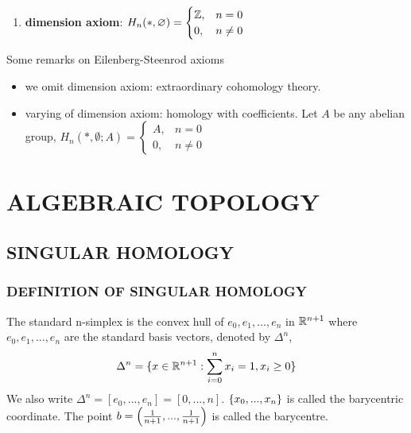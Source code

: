 \documentclass{report}
\begin{document}
\begin{axiom}
\begin{enumerate}
        \item \textbf{dimension axiom}: $H_n(*, \emptyset) = \begin{cases}
            \Z, &n = 0 \\
            0, &n \neq 0
        \end{cases}$
    \end{enumerate}
\end{axiom}

\begin{remark}
    Some remarks on Eilenberg-Steenrod axioms
    \begin{itemize}
        \item we omit dimension axiom: extraordinary cohomology theory.
        \item varying of dimension axiom: homology with coefficients. Let $A$ be any abelian group, $H_n(*, \emptyset; A) = \begin{cases}
            A, &n = 0 \\
            0, &n \neq 0
        \end{cases}$
    \end{itemize}
    
\end{remark}







\chapter{ALGEBRAIC TOPOLOGY}
\section{SINGULAR HOMOLOGY}
\subsection{DEFINITION OF SINGULAR HOMOLOGY}

\begin{definition}
    The standard n-simplex is the convex hull of $e_0, e_1, ..., e_n$ in $\R^{n+1}$ where $e_0, e_1, ..., e_n$ are the standard basis vectors, denoted by $\Delta^n$,
    $$
        \Delta^n = \set{x \in \R^{n+1}: \sum_{i=0}^n x_i = 1, x_i \geq 0}
    $$
    We also write $\Delta^n = [e_0,..., e_n] = [0,..., n]$. $\set{x_0, ..., x_n}$ is called the barycentric coordinate. The point $b = \tuple*{\frac{1}{n+1}, ..., \frac{1}{n+1}}$ is called the barycentre.
\end{definition}
\end{document}
